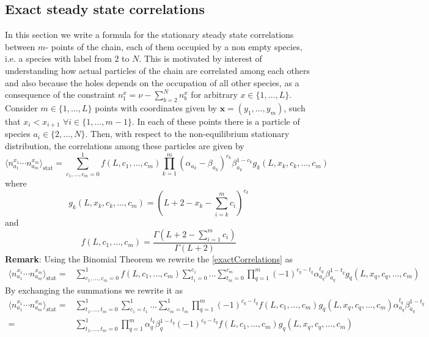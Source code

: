 \documentclass[10pt]{article}
\numberwithin{equation}{section}
\numberwithin{equation}{subsection}
\begin{document}
\subsection{Exact steady state correlations}\label{correlation-section}
In this section we write a formula for the stationary steady state correlations between $m$- points of the chain, each of them occupied by a non empty species, i.e. a species with label from $2$ to $N$. This is motivated by interest of understanding how actual particles of the chain are correlated among each others and also because the holes depends on the occupation of all other species, as a consequence of the constraint $n_{1}^{x}=\nu-\sum_{b=2}^{N}n_{b}^{x}$ for arbitrary $x\in \{1,\ldots,L\}$. Consider $m\in \{1,\ldots,L\}$ points with coordinates given by $\bm{x}=(y_{1},\ldots,y_{m})$, such that $x_{i}<x_{i+1}$ $\forall i\in \{1,\ldots,m-1\}$. In each of these points there is a particle of species $a_{i}\in \{2,\ldots,N\}$. Then, with respect to the non-equilibrium stationary distribution, the correlations among these particles are given by
\begin{equation}\label{exactCorrelations}
		\langle n^{x_{1}}_{a_{1}}\cdots n^{x_{m}}_{a_{m}}\rangle_{\text{stat}}=\sum_{c_{1},\ldots,c_{m}=0}^{1}
			f(L,c_{1},\ldots,c_{m})\prod_{k=1}^{m}(\alpha_{a_{k}}-\beta_{a_{k}})^{c_{k}}\beta_{a_{k}}^{1-c_{k}}g_{k}(L,x_{k},c_{k},\ldots,c_{m})
	\end{equation}
	where 
	\begin{equation}\label{powerCoeffSpecies}
		g_{k}(L,x_{k},c_{k},\ldots,c_{m})=\left(L+2-x_{k}-\sum_{i=k}^{m}c_{i}\right)^{c_{k}}
	\end{equation}
	and 
	\begin{equation}\label{powerCoeffNOspec}
		f(L,c_{1},\ldots,c_{m})=\frac{\Gamma(L+2-\sum_{i=1}^{m}c_{i})}{\Gamma(L+2)}
	\end{equation}
\textbf{Remark}: Using the Binomial Theorem we rewrite the \eqref{exactCorrelations} as 
\begin{equation}
\begin{split}
\langle n^{x_{1}}_{a_{1}}\cdots n^{x_{m}}_{a_{m}}\rangle_{\text{stat}}=&\sum_{c_{1},\ldots,c_{m}=0}^{1}
f(L,c_{1},\ldots,c_{m})\sum_{t_{1}=0}^{c_{1}}\ldots\sum_{t_{m}=0}^{c_{m}}\prod_{q=1}^{m}(-1)^{c_{q}-t_{q}}\alpha_{a_{q}}^{t_{q}}\beta_{a_{q}}^{1-t_{q}}g_{q}(L,x_{q},c_{q},\ldots,c_{m})
\end{split}
\end{equation}
By exchanging the summations we rewrite it as 
\begin{equation}
\begin{split}
\langle n^{x_{1}}_{a_{1}}\cdots n^{x_{m}}_{a_{m}}\rangle_{\text{stat}}=&\sum_{t_{1},\ldots,t_{m}=0}^{1}
\sum_{c_{1}=t_{1}}^{1}\ldots\sum_{c_{m}=t_{m}}^{1}\prod_{q=1}^{m}(-1)^{c_{q}-t_{q}}f(L,c_{1},\ldots,c_{m})g_{q}(L,x_{q},c_{q},\ldots,c_{m})\alpha_{a_{q}}^{t_{q}}\beta_{a_{q}}^{1-t_{q}}\\
=&\sum_{t_{1},\ldots,t_{m}=0}^{1}\prod_{q=1}^{m}\alpha_{q}^{t_{q}}\beta_{q}^{1-t_{q}}(-1)^{c_{q}-t_{q}}f(L,c_{1},\ldots,c_{m})g_{q}(L,x_{q},c_{q},\ldots,c_{m})
\end{split}
\end{equation}
\end{document}
